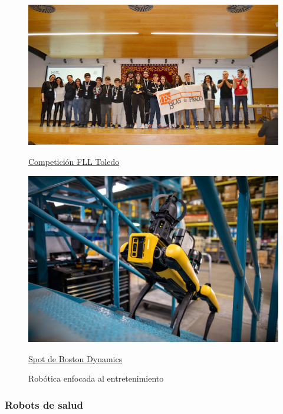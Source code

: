 \begin{figure}[ht!]
	\centering
	\begin{minipage}{0.3\linewidth}
		\centering
		\includegraphics[width=\linewidth]{figs/FLL_TO19.jpg}
		\caption*{\centering\href{https://www.uclm.es/noticias/febrero2019/toledo/finalfirstlegoleague}{Competición FLL Toledo} }
	\end{minipage}
	\hspace{3cm}
	\begin{minipage}{0.3\linewidth}
		\centering
		\includegraphics[width=\linewidth]{figs/spot.jpg}
		\caption*{\centering\href{https://bostondynamics.com/products/spot/}{Spot de Boston Dynamics}}
	\end{minipage}
	\caption{Robótica enfocada al entretenimiento}
	\label{fig:robed}
\end{figure}


\subsubsection{Robots de salud}


